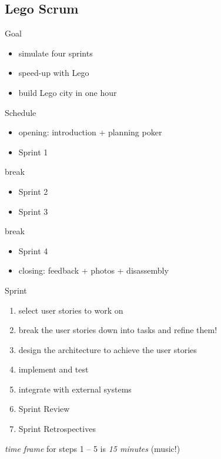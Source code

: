 \documentclass[
	aspectratio=169, %
	8pt, %
]{beamer}
\begin{document}
\subsection{Lego Scrum}
\begin{frame}{\insertsubsection}
	\begin{fancycolumns} 
		\begin{definition}{Goal}
			\begin{itemize}
				\item simulate four sprints
				\item speed-up with Lego
				\item build Lego city in one hour
			\end{itemize}
		\end{definition}
		\begin{definition}{Schedule}
			\begin{itemize}
				\item opening: introduction + planning poker
				\item Sprint 1
			\end{itemize}
			break
			\begin{itemize}
				\item Sprint 2
				\item Sprint 3
			\end{itemize}
			break
			\begin{itemize}
				\item Sprint 4
				\item closing: feedback + photos + disassembly
			\end{itemize}
		\end{definition}
		\nextcolumn
		\begin{note}{Sprint}
			\begin{enumerate}
				\item select user stories to work on
				\item break the user stories down into tasks and refine them!
				\item design the architecture to achieve the user stories
				\item implement and test
				\item integrate with external systems
				\item Sprint Review
				\item Sprint Retrospectives
			\end{enumerate}
			\emph{time frame} for steps 1 -- 5 is \emph{15 minutes} (music!)
		\end{note}
	\end{fancycolumns}
\end{frame}
\end{document}
